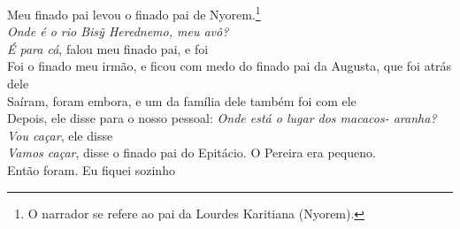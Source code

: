 \bigskip

\begin{linenumbers}\begingroup\raggedright
 
\noindent   Meu finado pai levou o finado pai de Nyorem.\footnote{O narrador se refere ao pai da Lourdes Karitiana (Nyorem).}\\
  \textit{Onde é o rio \textit{Bisỹ Herednemo}, meu avô?}\\
  \textit{É para cá}, falou meu finado pai, e foi\\
  Foi o finado meu irmão, e ficou com medo do finado pai da Augusta, que foi atrás dele\\
  Saíram, foram embora, e um da família dele também foi com ele\\
  Depois, ele disse para o nosso pessoal: \textit{Onde está o lugar dos macacos- aranha?}\\
  \textit{Vou caçar}, ele disse\\
  \textit{Vamos caçar}, disse o finado pai do Epitácio. O Pereira era pequeno.\\
  Então foram. Eu fiquei sozinho
 
\end{linenumbers}\endgroup

\bigskip

